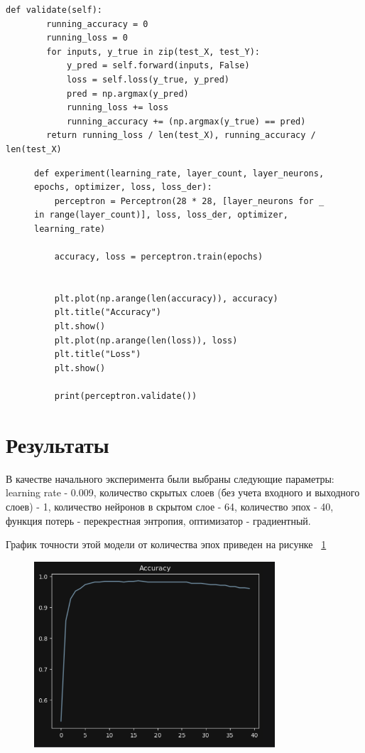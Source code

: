 \documentclass[a4paper, 14pt]{extarticle}
\begin{document}
\begin{lstlisting}[language={},caption={Класс перцептрона},label={lst:code5}, breaklines=true]
    def validate(self):
        running_accuracy = 0
        running_loss = 0
        for inputs, y_true in zip(test_X, test_Y):
            y_pred = self.forward(inputs, False)
            loss = self.loss(y_true, y_pred)
            pred = np.argmax(y_pred)
            running_loss += loss
            running_accuracy += (np.argmax(y_true) == pred)
        return running_loss / len(test_X), running_accuracy / len(test_X)
\end{lstlisting}


\begin{figure}[H]
\begin{lstlisting}[language={},caption={Класс эксперимента},label={lst:code6}]
def experiment(learning_rate, layer_count, layer_neurons, epochs, optimizer, loss, loss_der):
    perceptron = Perceptron(28 * 28, [layer_neurons for _ in range(layer_count)], loss, loss_der, optimizer, learning_rate)

    accuracy, loss = perceptron.train(epochs)


    plt.plot(np.arange(len(accuracy)), accuracy)
    plt.title("Accuracy")
    plt.show()
    plt.plot(np.arange(len(loss)), loss)
    plt.title("Loss")
    plt.show()

    print(perceptron.validate())
\end{lstlisting}
\end{figure}

\section{Результаты}

В качестве начального эксперимента были выбраны следующие параметры: learning rate - 0.009, количество скрытых слоев (без учета входного и выходного слоев) - 1, количество нейронов в скрытом слое - 64, количество эпох - 40, функция потерь - перекрестная энтропия, оптимизатор - градиентный.

График точности этой модели от количества эпох приведен на рисунке ~\ref{fig:img1}

\begin{figure}[H]
\centering
\includegraphics[width=0.8\textwidth]{images/res1.png}
\caption{}
\label{fig:img1}
\end{figure}
\end{document}
